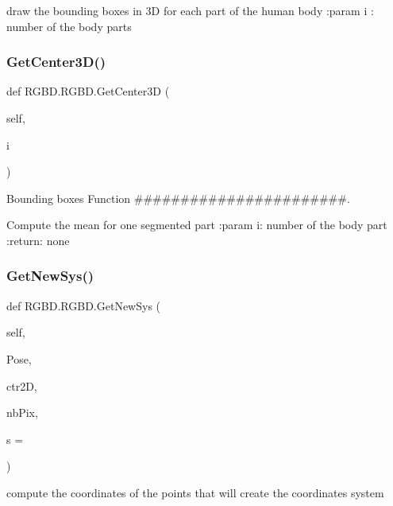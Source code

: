 \begin{DoxyVerb}draw the bounding boxes in 3D for each part of the human body
:param i : number of the body parts
\end{DoxyVerb}
 \mbox{\label{class_r_g_b_d_1_1_r_g_b_d_ac25c17b6a7e89feffc914d4b12f0b22e}} 
\subsubsection{\texorpdfstring{Get\+Center3\+D()}{GetCenter3D()}}
{\footnotesize\ttfamily def R\+G\+B\+D.\+R\+G\+B\+D.\+Get\+Center3D (\begin{DoxyParamCaption}\item[{}]{self,  }\item[{}]{i }\end{DoxyParamCaption})}



Bounding boxes Function \#\#\#\#\#\#\#\#\#\#\#\#\#\#\#\#\#\#\#\#\#\#\#. 

\begin{DoxyVerb}Compute the mean for one segmented part
:param i: number of the body part
:return: none
\end{DoxyVerb}
 \mbox{\label{class_r_g_b_d_1_1_r_g_b_d_ae3ffd53a2aef9f3d955fe40887fe88c1}} 
\subsubsection{\texorpdfstring{Get\+New\+Sys()}{GetNewSys()}}
{\footnotesize\ttfamily def R\+G\+B\+D.\+R\+G\+B\+D.\+Get\+New\+Sys (\begin{DoxyParamCaption}\item[{}]{self,  }\item[{}]{Pose,  }\item[{}]{ctr2D,  }\item[{}]{nb\+Pix,  }\item[{}]{s = {} }\end{DoxyParamCaption})}

\begin{DoxyVerb}compute the coordinates of the points that will create the coordinates system
\end{DoxyVerb}
 \mbox{\label{class_r_g_b_d_1_1_r_g_b_d_a58c29e9445dde3116abaf4ece69a5c71}} 

